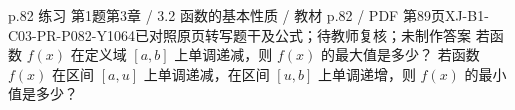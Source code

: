 \par\noindent\begin{minipage}{\linewidth}
\begin{bankitem}{p.82 练习 第1题}{第3章 / 3.2 函数的基本性质 / 教材 p.82 / PDF 第89页}{XJ-B1-C03-PR-P082-Y1064}{已对照原页转写题干及公式；待教师复核；未制作答案}
若函数 $f(x)$ 在定义域 $[a,b]$ 上单调递减，则 $f(x)$ 的最大值是多少？
若函数 $f(x)$ 在区间 $[a,u]$ 上单调递减，在区间 $[u,b]$ 上单调递增，则 $f(x)$ 的最小值是多少？
\end{bankitem}
\end{minipage}\par\medskip

